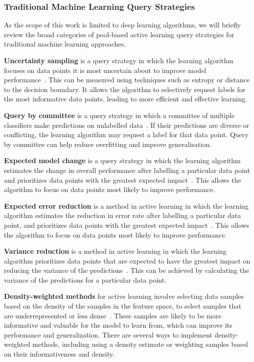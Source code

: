 \subsubsection{Traditional Machine Learning Query Strategies}
As the scope of this work is limited to deep learning algorithms, we will briefly review the broad categories of pool-based active learning query strategies for traditional machine learning approaches.

\textbf{Uncertainty sampling} is a query strategy in which the learning algorithm focuses on data points it is most uncertain about to improve model performance~\citep{lewis1995sequential}. This can be measured using techniques such as entropy or distance to the decision boundary. It allows the algorithm to selectively request labels for the most informative data points, leading to more efficient and effective learning. 

\textbf{Query by committee} is a query strategy in which a committee of multiple classifiers make predictions on unlabelled data~\citep{seung1992query}. If their predictions are diverse or conflicting, the learning algorithm may request a label for that data point. Query by committee can help reduce overfitting and improve generalisation.

\textbf{Expected model change} is a query strategy in which the learning algorithm estimates the change in overall performance after labelling a particular data point and prioritizes data points with the greatest expected impact~\citep{settles2007multiple}. This allows the algorithm to focus on data points most likely to improve performance.

\textbf{Expected error reduction} is a method in active learning in which the learning algorithm estimates the reduction in error rate after labelling a particular data point, and prioritizes data points with the greatest expected impact~\citep{roy2001toward}. This allows the algorithm to focus on data points most likely to improve performance. 

\textbf{Variance reduction} is a method in active learning in which the learning algorithm prioritizes data points that are expected to have the greatest impact on reducing the variance of the predictions~\citep{cohn1996active}. This can be achieved by calculating the variance of the predictions for a particular data point. 

\textbf{Density-weighted methods} for active learning involve selecting data samples based on the density of the samples in the feature space, to select samples that are underrepresented or less dense~\citep{settles2008analysis}. These samples are likely to be more informative and valuable for the model to learn from, which can improve its performance and generalization. There are several ways to implement density-weighted methods, including using a density estimate or weighting samples based on their informativeness and density.

